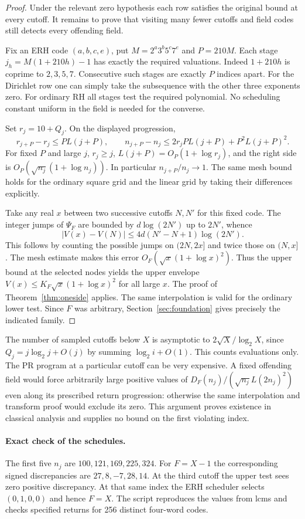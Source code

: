 \begin{proof}
Under the relevant zero hypothesis each row satisfies the original bound at every cutoff. It remains to prove that visiting many fewer cutoffs and field codes still detects every offending field.

Fix an ERH code $(a,b,c,e)$, put $M=2^a3^b5^c7^e$ and $P=210M$. Each stage $j_h=M(1+210h)-1$ has exactly the required valuations. Indeed $1+210h$ is coprime to $2,3,5,7$. Consecutive such stages are exactly $P$ indices apart. For the Dirichlet row one can simply take the subsequence with the other three exponents zero. For ordinary RH all stages test the required polynomial. No scheduling constant uniform in the field is needed for the converse.

Set $r_j=10+Q_j$. On the displayed progression,
\[
 r_{j+P}-r_j\le P L(j+P),\qquad
 n_{j+P}-n_j\le 2r_jP L(j+P)+P^2L(j+P)^2 .
\]
For fixed $P$ and large $j$, $r_j\ge j$, $L(j+P)=O_P(1+\log r_j)$, and the right side is $O_P(\sqrt{n_j}(1+\log n_j))$. In particular $n_{j+P}/n_j\to1$. The same mesh bound holds for the ordinary square grid and the linear grid by taking their differences explicitly.

Take any real $x$ between two successive cutoffs $N,N'$ for this fixed code. The integer jumps of $\Psi_F$ are bounded by $d\log(2N')$ up to $2N'$, whence
\[
 |V(x)-V(N)|\le 4d(N'-N+1)\log(2N').
\]
This follows by counting the possible jumps on $(2N,2x]$ and twice those on $(N,x]$. The mesh estimate makes this error $O_F(\sqrt{x}(1+\log x)^2)$. Thus the upper bound at the selected nodes yields the upper envelope $V(x)\le K_F\sqrt x(1+\log x)^2$ for all large $x$. The proof of Theorem~\ref{thm:oneside} applies. The same interpolation is valid for the ordinary lower test. Since $F$ was arbitrary, Section~\ref{sec:foundation} gives precisely the indicated family.
\end{proof}

The number of sampled cutoffs below $X$ is asymptotic to $2\sqrt X/\log_2 X$, since $Q_j=j\log_2 j+O(j)$ by summing $\log_2 i+O(1)$. This counts evaluations only. The PR program at a particular cutoff can be very expensive. A fixed offending field would force arbitrarily large positive values of $D_F(n_j)/(\sqrt{n_j}L(2n_j)^2)$ even along its prescribed return progression: otherwise the same interpolation and transform proof would exclude its zero. This argument proves existence in classical analysis and supplies no bound on the first violating index.

\paragraph{Exact check of the schedules.}
The first five $n_j$ are $100,121,169,225,324$. For $F=X-1$ the corresponding signed discrepancies are $27,8,-7,28,14$. At the third cutoff the upper test sees zero positive discrepancy. At that same index the ERH scheduler selects $(0,1,0,0)$ and hence $F=X$. The script  reproduces the values from lcms and checks specified returns for 256 distinct four-word codes.

